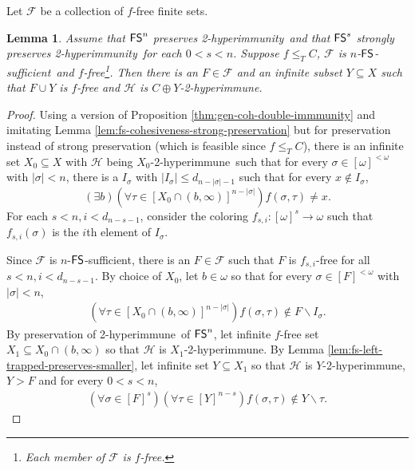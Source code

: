 \documentclass{amsart}
\newtheorem{lemma}[theorem]{Lemma}
\theoremstyle{definition}
\theoremstyle{remark}
\numberwithin{equation}{section}
\theoremstyle{noparens}
\def\propertyL{2-hyperimmunity}
\def\hyper{2-hyperimmune}
\def\mcal{\mathcal}
\newcommand{\Hcal}{\mathcal{H}}
\renewcommand{\setminus}{\smallsetminus}
\newcommand{\s}[1]{\ensuremath{\sf{#1}}}
\DeclareMathOperator{\fs}{\s{FS}}
\def\fssufficient{$\fs$-sufficient}
\begin{document}
Let $\mcal{F}$ be a collection of $f$-free finite sets.
\begin{lemma}\label{lem:fs-with-enough-sets-free}
Assume that $\fs^n$ preserves \propertyL\
and that $\fs^s$ strongly preserves \propertyL\ for each $0<s<n$.
Suppose $f\leq_T C$, $\mcal{F}$ is $n$-\fssufficient\ and   $f$-free\footnote{Each member of $\mcal F$ is $f$-free.}.
Then
there is an $F\in\mcal{F}$
and an infinite subset $Y \subseteq X$
such that $F \cup Y$ is $f$-free and $\Hcal$ is $C \oplus Y$-\hyper.
\end{lemma}
\begin{proof}
Using a version of Proposition \ref{thm:gen-coh-double-immmunity}
and imitating Lemma \ref{lem:fs-cohesiveness-strong-preservation} but for preservation instead of strong preservation
 (which is feasible since $f \leq_T C$),
there is an infinite set $X_0\subseteq X$
with $\Hcal$ being $X_0$-\hyper\ such that
for every $\sigma\in [\omega]^{<\omega}$ with $|\sigma|< n$,
there is a $I_\sigma$ with $|I_\sigma|\leq d_{n - |\sigma|-1}$
such that
for every $x\notin I_\sigma$,
$$
(\exists b)(\forall \tau\in [X_0\cap(b,\infty)]^{n-|\sigma|})
f(\sigma,\tau)\ne x.
$$
For each $s< n, i<d_{n-s-1}$,
consider the coloring $f_{s,i}:[\omega]^s\rightarrow \omega$
such that $f_{s,i}(\sigma)$ is the $i$th element of $I_\sigma$.

Since $\mcal{F}$ is $n$-\fssufficient,
there is an $F\in\mcal{F}$
such that $F$ is $f_{s,i}$-free for all $s< n,i<d_{n-s-1}$.
By choice of $X_0$, let $b\in\omega$ so that
for every $\sigma\in [F]^{<\omega}$ with $|\sigma|<n$,
\begin{align}\label{fstseq9}
(\forall \tau\in [X_0\cap (b,\infty)]^{n-|\sigma|})
f(\sigma,\tau)\notin F\setminus I_\sigma.
\end{align}
By preservation of \hyper\ of $\fs^n$,
let infinite $f$-free set $X_1\subseteq X_0\cap (b,\infty)$
so that $\Hcal$ is $X_1$-\hyper.
By Lemma \ref{lem:fs-left-trapped-preserves-smaller},
let infinite set $Y\subseteq X_1$
so that $\Hcal$ is $Y$-\hyper, $Y>F$
and for every $0<s<n$,
\begin{align}\label{fstseq8}
(\forall \sigma \in [F]^s)(\forall \tau \in [Y]^{n-s})f(\sigma, \tau) \not \in Y \setminus \tau.
\end{align}


\end{proof}
\end{document}
